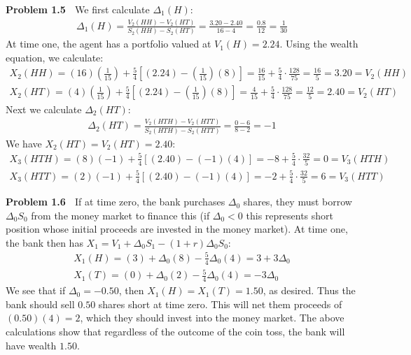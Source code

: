 \documentclass[12pt, letterpaper]{article}
\begin{document}
\vspace{5mm}
\noindent
\textbf{Problem 1.5} $\;$ We first calculate $\Delta_1(H)$:
\begin{align*}
    \Delta_1(H) = \frac{V_2(HH)- V_2(HT)}{S_2(HH)-S_2(HT)} = \frac{3.20 - 2.40}{16-4} = \frac{0.8}{12} = \frac{1}{30}
\end{align*}
At time one, the agent has a portfolio valued at $V_1(H)=2.24$.
Using the wealth equation, we calculate:
\begin{gather*}
    X_{2}(HH) = (16)\left(\tfrac{1}{15}\right) + \tfrac{5}{4}\left[ (2.24) - \left(\tfrac{1}{15}\right)(8) \right] = \tfrac{16}{15} + \tfrac{5}{4}\cdot\tfrac{128}{75} = \tfrac{16}{5} = 3.20 = V_2(HH)\\
    X_{2}(HT) = (4)\left(\tfrac{1}{15}\right) + \tfrac{5}{4}\left[ (2.24) - \left(\tfrac{1}{15}\right)(8) \right] = \tfrac{4}{15} + \tfrac{5}{4}\cdot\tfrac{128}{75} = \tfrac{12}{5} = 2.40 = V_2(HT)
\end{gather*}
Next we calculate $\Delta_2(HT)$:
\begin{align*}
    \Delta_2(HT) = \frac{V_2(HTH)- V_2(HTT)}{S_2(HTH)-S_2(HTT)} = \frac{0-6}{8-2} = -1
\end{align*}
We have $X_2(HT)=V_2(HT)=2.40$:
\begin{gather*}
    X_{3}(HTH) = (8)(-1) + \tfrac{5}{4}\left[ (2.40) - (-1)(4) \right] = - 8 + \tfrac{5}{4}\cdot \tfrac{32}{5} = 0 = V_3(HTH) \\
    X_{3}(HTT) = (2)(-1) + \tfrac{5}{4}\left[ (2.40) - (-1)(4) \right] = - 2 + \tfrac{5}{4}\cdot \tfrac{32}{5} = 6 = V_3(HTT)
\end{gather*}

\rightline{$\square$}

\vspace{5mm}
\noindent
\textbf{Problem 1.6} $\;$ If at time zero, the bank purchases $\Delta_0$ shares, they must borrow $\Delta_0 S_0$ from the money market to finance this (if $\Delta_0<0$ this represents short position whose initial proceeds are invested in the money market).
At time one, the bank then has $X_1 = V_1 + \Delta_0 S_1 - (1+r)\Delta_0 S_0$:
\begin{gather*}
    X_1(H) = (3) + \Delta_0 (8) - \tfrac{5}{4}\Delta_0 (4) = 3 + 3\Delta_0 \\
    X_1(T) = (0) + \Delta_0 (2) - \tfrac{5}{4}\Delta_0 (4) = -3 \Delta_0
\end{gather*}
We see that if $\Delta_0 = -0.50$, then $X_1(H) = X_1(T) = 1.50 $, as desired.
Thus the bank should sell $0.50$ shares short at time zero.
This will net them proceeds of $(0.50)(4) = 2$, which they should invest into the money market.
The above calculations show that regardless of the outcome of the coin toss, the bank will have wealth $1.50$.
\end{document}
